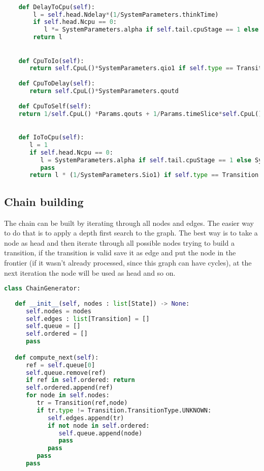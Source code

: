 \documentclass[12pt,a4paper]{article}
\begin{document}
    \begin{lstlisting}[language=python]

    def DelayToCpu(self):
        l = self.head.Ndelay*(1/SystemParameters.thinkTime)
        if self.head.Ncpu == 0:
           l *= SystemParameters.alpha if self.tail.cpuStage == 1 else  SystemParameters.beta
        return l
        

    def CpuToIo(self):      
       return self.CpuL()*SystemParameters.qio1 if self.type == Transition.TransitionType.CPU_TO_IO1 else self.CpuL()*SystemParameters.qio2
        
    def CpuToDelay(self):
       return self.CpuL()*SystemParameters.qoutd
        
    def CpuToSelf(self):
    return 1/self.CpuL() *Params.qouts + 1/Params.timeSlice*self.CpuL()

        
    def IoToCpu(self):
       l = 1
       if self.head.Ncpu == 0:
          l = SystemParameters.alpha if self.tail.cpuStage == 1 else SystemParameters.beta
          pass
       return l * (1/SystemParameters.Sio1) if self.type == Transition.TransitionType.IO1_TO_CPU else l* (1/SystemParameters.Sio2)
        \end{lstlisting}


\subsection{Chain building}
The chain can be built by iterating through all nodes and edges. The easier way to do that is to apply a depth first search to the graph. The best way is to take a node as head and then iterate through all possible nodes trying to build a transition, if the transition is valid save it as edge and put the node in the frontier (if it wasn't already processed, since this graph can have cycles), at the next iteration the node will be used as head and so on. 
\begin{lstlisting}[language=python]
class ChainGenerator:
   
   def __init__(self, nodes : list[State]) -> None:
      self.nodes = nodes
      self.edges : list[Transition] = []
      self.queue = []
      self.ordered = []   
      pass

   def compute_next(self):
      ref = self.queue[0]
      self.queue.remove(ref)
      if ref in self.ordered: return
      self.ordered.append(ref)
      for node in self.nodes:
         tr = Transition(ref,node)
         if tr.type != Transition.TransitionType.UNKNOWN:
            self.edges.append(tr)
            if not node in self.ordered:
               self.queue.append(node)
               pass
            pass
         pass
      pass
\end{lstlisting}
\end{document}
